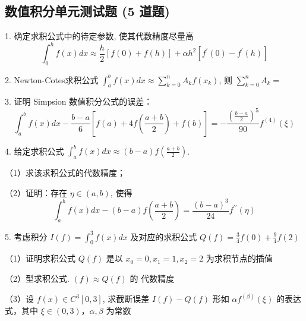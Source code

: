 \subsection{数值积分单元测试题 (5 道题)}

1. 确定求积公式中的待定参数, 使其代数精度尽量高
$$
\int_{0}^{h} f(x) d x \approx \frac{h}{2}[f(0)+f(h)]+\alpha h^{2}\left[f^{\prime}(0)-f^{\prime}(h)\right]
$$

2. Newton-Cotes求积公式 $\displaystyle \int_{a}^{b} f(x) d x \approx \sum\limits_{k=0}^{n} A_{k} f\left(x_{k}\right) $, 则 $ \sum\limits_{k=0}^{n} A_{k}= $ $ \qquad $

3. 证明 Simpsion 数值积分公式的误差：
$$
\int_{a}^{b} f(x) d x-\frac{b-a}{6}\left[f(a)+4 f\left(\frac{a+b}{2}\right)+f(b)\right]=-\frac{\left(\frac{b-a}{2}\right)^{5}}{90} f^{(4)}(\xi)
$$

4. 给定求积公式 $ \int_{a}^{b} f(x) d x \approx(b-a) f\left(\frac{a+b}{2}\right) $.

（1）求该求积公式的代数精度；

（2）证明：存在 $ \eta \in(a, b) $, 使得
$$
\int_{a}^{b} f(x) d x-(b-a) f\left(\frac{a+b}{2}\right)=\frac{(b-a)^{3}}{24} f^{\prime \prime}(\eta)
$$

5. 考虑积分 $ I(f)=\int_{0}^{3} f(x) d x $ 及对应的求积公式 $ Q(f)=\frac{3}{4} f(0)+\frac{9}{4} f(2) $

（1）证明求积公式 $ Q(f) $ 是以 $ x_{0}=0, x_{1}=1, x_{2}=2 $ 为求积节点的插值

（2）型求积公式. $ (f) \approx Q(f) $ 的 代数精度

（3）设 $ f(x) \in C^{3}[0,3] $, 求截断误差 $ I(f)-Q(f) $ 形如 $ \alpha f^{(\beta)}(\xi) $ 的表达式，其中 $ \xi \in(0,3) ， \alpha, \beta $ 为常数